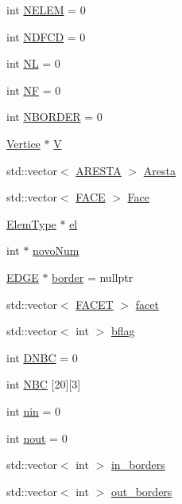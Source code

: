 \begin{DoxyCompactItemize}
int \hyperlink{classGeProb_ac5a0f21b0737394d783b9ca32317ece8}{N\+E\+L\+EM} = 0
\item 
int \hyperlink{classGeProb_a2894b14d50728f945721f2c85e1fba4d}{N\+D\+F\+CD} = 0
\item 
int \hyperlink{classGeProb_a4608e6b80b16c86a7bd7451adebc6f69}{NL} = 0
\item 
int \hyperlink{classGeProb_a4168b4f9002df61cb396728b9eecbdca}{NF} = 0
\item 
int \hyperlink{classGeProb_a7ff7ce9c7e12c1bb099c41b7fdc91d7d}{N\+B\+O\+R\+D\+ER} = 0
\item 
\hyperlink{structVertice}{Vertice} $\ast$ \hyperlink{classGeProb_aaa26398869b601604a4a5f3032c46070}{V}
\item 
std\+::vector$<$ \hyperlink{structARESTA}{A\+R\+E\+S\+TA} $>$ \hyperlink{classGeProb_af82bffefd5e8fe33dec7ef5b8098a9b4}{Aresta}
\item 
std\+::vector$<$ \hyperlink{structFACE}{F\+A\+CE} $>$ \hyperlink{classGeProb_af050a3c4e639bd19028c49877aa10583}{Face}
\item 
\hyperlink{spectral_8h_aaa2c1a7b2d1b12c590d730fe6ac839fa}{Elem\+Type} $\ast$ \hyperlink{classGeProb_ac32127758c84295eb361466cf37afcac}{el}
\item 
int $\ast$ \hyperlink{classGeProb_ab8ee4f31d624e14988e65a7cd5c6a457}{novo\+Num}
\item 
\hyperlink{structEDGE}{E\+D\+GE} $\ast$ \hyperlink{classGeProb_a6c144ac05b601c5d6141c711edaaa775}{border} = nullptr
\item 
std\+::vector$<$ \hyperlink{structFACET}{F\+A\+C\+ET} $>$ \hyperlink{classGeProb_a876f8c65be4b17f3c2b7b4b0605f34c1}{facet}
\item 
std\+::vector$<$ int $>$ \hyperlink{classGeProb_a60d3ba92d41a0776cdb3869e9bfeff7e}{bflag}
\item 
int \hyperlink{classGeProb_a416b1ac091d91a8959a4ff2518948466}{D\+N\+BC} = 0
\item 
int \hyperlink{classGeProb_a5fb604ebcc5130a7ad4719d5f6578cb9}{N\+BC} \mbox{[}20\mbox{]}\mbox{[}3\mbox{]}
\item 
int \hyperlink{classGeProb_a2434630926ff59b81f12420354f533a7}{nin} = 0
\item 
int \hyperlink{classGeProb_ae6ee447645542bcb3addd78e9896f546}{nout} = 0
\item 
std\+::vector$<$ int $>$ \hyperlink{classGeProb_a9615df97c98b9b37d98f8548fad48439}{in\+\_\+borders}
\item 
std\+::vector$<$ int $>$ \hyperlink{classGeProb_a2ac12ca16e62807fd3c69d97bf665336}{out\+\_\+borders}

\end{DoxyCompactItemize}
